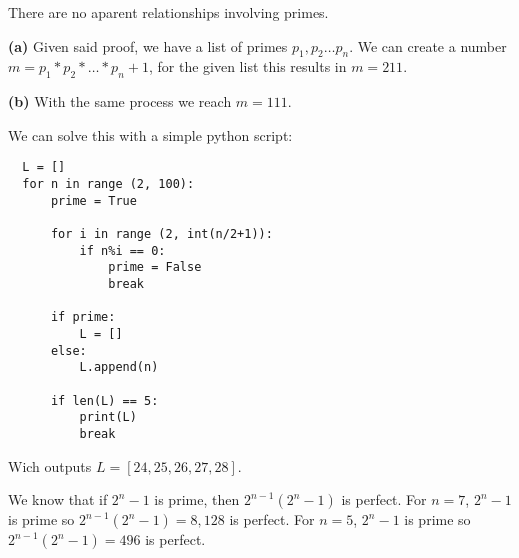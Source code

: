 There are no aparent relationships involving primes.  


\sol \textbf{(a)} Given said proof, we have a list of primes $p_1,p_2 \ldots p_n$.
We can create a number $m = p_1 * p_2 * \ldots * p_n + 1$, for the given list this results in $m = 211$.

\sol \textbf{(b)} With the same process we reach $m = 111$.


\sol 
We can solve this with a simple python script:
\begin{verbatim}
  L = []
  for n in range (2, 100):
      prime = True

      for i in range (2, int(n/2+1)):
          if n%i == 0:
              prime = False
              break

      if prime:
          L = []
      else:
          L.append(n)

      if len(L) == 5:
          print(L)
          break
\end{verbatim}
Wich outputs $L = [24, 25, 26, 27, 28]$.
 

\sol We know that if $2^n - 1$ is prime, then $2^{n-1}(2^n -1)$ is perfect.
For $n = 7$, $2^n - 1$ is prime so $2^{n-1}(2^n -1) = 8,128$ is perfect.
For $n = 5$, $2^n - 1$ is prime so $2^{n-1}(2^n -1) = 496$ is perfect.

\newpage

